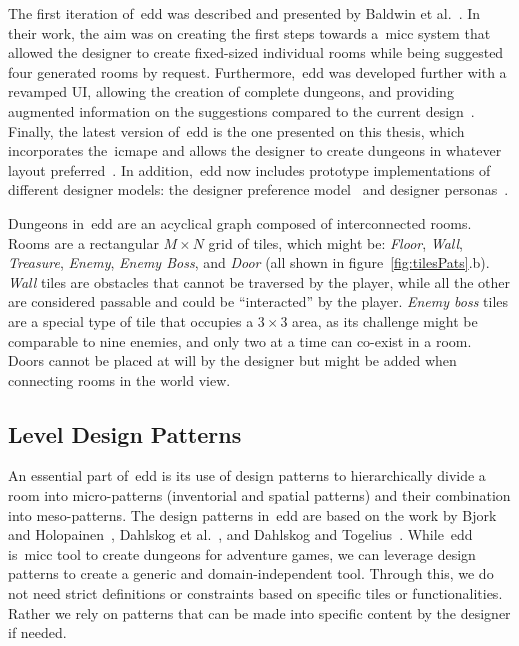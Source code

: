 
The first iteration of~\acrshort{edd} was described and presented by Baldwin et al.~\cite{baldwin_mixed-initiative_2017,baldwin_towards_2017}. In their work, the aim was on creating the first steps towards a~\acrshort{micc} system that allowed the designer to create fixed-sized individual rooms while being suggested four generated rooms by request. Furthermore,~\acrshort{edd} was developed further with a revamped UI, allowing the creation of complete dungeons, and providing augmented information on the suggestions compared to the current design~\cite{alvarez_fostering_2018,alvarez_assessing_2018}. Finally, the latest version of~\acrshort{edd} is the one presented on this thesis, which incorporates the~\acrshort{icmape} and allows the designer to create dungeons in whatever layout preferred~\cite{alvarez_empowering_2019,alvarez_interactive_2020}. In addition,~\acrshort{edd} now includes prototype implementations of different designer models: the designer preference model~\cite{alvarez_exploring_2020} and designer personas~\cite{alvarez_designer_2022}.

Dungeons in~\acrshort{edd} are an acyclical graph composed of interconnected rooms. Rooms are a rectangular $M \times N$ grid of tiles, which might be: \emph{Floor}, \emph{Wall}, \emph{Treasure}, \emph{Enemy}, \emph{Enemy Boss}, and \emph{Door} (all shown in figure~\ref{fig:tilesPats}.b). \emph{Wall} tiles are obstacles that cannot be traversed by the player, while all the other are considered passable and could be ``interacted'' by the player. \emph{Enemy boss} tiles are a special type of tile that occupies a $3\times3$ area, as its challenge might be comparable to nine enemies, and only two at a time can co-exist in a room. Doors cannot be placed at will by the designer but might be added when connecting rooms in the world view. 



\subsection{Level Design Patterns}

An essential part of~\acrshort{edd} is its use of design patterns to hierarchically divide a room into micro-patterns (inventorial and spatial patterns) and their combination into meso-patterns. The design patterns in~\acrshort{edd} are based on the work by Bjork and Holopainen~\cite{bjork_patterns_2004}, Dahlskog et al.~\cite{dahlskog_patterns_2015}, and Dahlskog and Togelius~\cite{dahlskog_procedural_2014}. While~\acrshort{edd} is~\acrshort{micc} tool to create dungeons for adventure games, we can leverage design patterns to create a generic and domain-independent tool. Through this, we do not need strict definitions or constraints based on specific tiles or functionalities. Rather we rely on patterns that can be made into specific content by the designer if needed.

